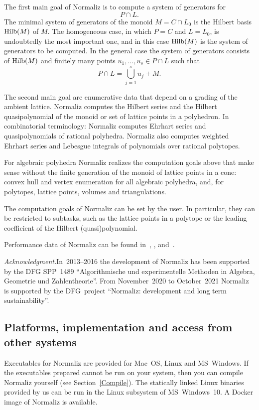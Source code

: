 The first main goal of Normaliz is to compute a system of generators for
$$
P\cap L.
$$
The minimal system of generators of the monoid $M=C\cap L_0$ is the Hilbert basis $\operatorname{Hilb}(M)$ of $M$. The homogeneous case, in which $P=C$ and $L=L_0$, is undoubtedly the most important one, and in this case $\operatorname{Hilb}(M)$ is the system of generators to be computed. In the general case the system of generators consists of $\operatorname{Hilb}(M)$ and finitely many points $u_1,\dots,u_s\in P\cap L$ such that
$$
P\cap L=\bigcup_{j=1}^s u_j+M.
$$

The second main goal are enumerative data that depend on a grading
of the ambient lattice. Normaliz computes the Hilbert series and
the Hilbert quasipolynomial of the monoid or set of lattice points in a polyhedron. In combinatorial terminology: Normaliz computes Ehrhart series and quasipolynomials of rational polyhedra. Normaliz also computes weighted
Ehrhart series and Lebesgue integrals of polynomials over
rational polytopes.

For algebraic polyhedra Normaliz realizes the computation goals above that make sense without the finite generation of the monoid of lattice points in a cone: convex hull and vertex enumeration for all algebraic polyhedra, and, for polytopes, lattice points, volumes and triangulations.

The computation goals of Normaliz can be set by the user. In particular, they can be restricted to subtasks, such as the lattice points in a polytope or the leading coefficient of the Hilbert (quasi)polynomial.

Performance data of Normaliz can be found in~\cite{BruVol}, \cite{BI2}, \cite{BIS} and~\cite{BIS2}.

\emph{Acknowledgment.}\enspace In~2013--2016 the development of Normaliz has been supported by the DFG SPP~1489 ``Algorithmische und experimentelle Methoden in Algebra, Geometrie und Zahlentheorie''. From November~2020 to October~2021 Normaliz is supported by the DFG~project ``Normaliz: development and long term sustainability''.

\subsection{Platforms, implementation and access from other systems}

Executables for Normaliz are provided for Mac~OS, Linux and MS~Windows. If the executables prepared cannot be run on your system, then you can compile Normaliz yourself (see Section~\ref{Compile}). The statically linked Linux binaries provided by us can be run in the Linux subsystem of MS~Windows~10. A Docker image of Normaliz is available.

